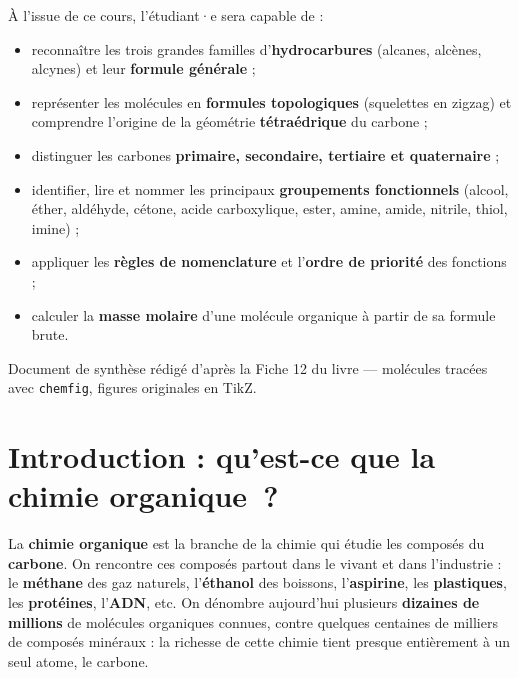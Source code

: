 \documentclass[11pt,a4paper]{article}
\begin{document}
\vspace{0.2cm}

\begin{tcolorbox}[boxbase,colback=primary!5,colframe=primary,width=15cm,
    title={\textsc{Objectifs pédagogiques de la fiche}}]
À l'issue de ce cours, l'étudiant·e sera capable de :
\begin{itemize}[leftmargin=1.6em,topsep=2pt,itemsep=1pt]
  \item reconnaître les trois grandes familles d'\textbf{hydrocarbures} (alcanes, alcènes, alcynes) et leur \textbf{formule générale} ;
  \item représenter les molécules en \textbf{formules topologiques} (squelettes en zigzag) et comprendre l'origine de la géométrie \textbf{tétraédrique} du carbone ;
  \item distinguer les carbones \textbf{primaire, secondaire, tertiaire et quaternaire} ;
  \item identifier, lire et nommer les principaux \textbf{groupements fonctionnels} (alcool, éther, aldéhyde, cétone, acide carboxylique, ester, amine, amide, nitrile, thiol, imine) ;
  \item appliquer les \textbf{règles de nomenclature} et l'\textbf{ordre de priorité} des fonctions ;
  \item calculer la \textbf{masse molaire} d'une molécule organique à partir de sa formule brute.
\end{itemize}
\end{tcolorbox}

\vspace{0.4cm}
{\small\color{black!60} Document de synthèse rédigé d'après la Fiche 12 du livre — molécules tracées avec \texttt{chemfig}, figures originales en TikZ.}
\par
\endgroup

\newpage
\renewcommand{\contentsname}{\textcolor{primarydark}{Table des matières}}
\tableofcontents
\thispagestyle{fancy}
\newpage

\section{Introduction : qu'est-ce que la chimie organique~?}
La \textbf{chimie organique} est la branche de la chimie qui étudie les composés du \textbf{carbone}. On rencontre ces composés partout dans le vivant et dans l'industrie : le \textbf{méthane} des gaz naturels, l'\textbf{éthanol} des boissons, l'\textbf{aspirine}, les \textbf{plastiques}, les \textbf{protéines}, l'\textbf{ADN}, etc. On dénombre aujourd'hui plusieurs \textbf{dizaines de millions} de molécules organiques connues, contre quelques centaines de milliers de composés minéraux : la richesse de cette chimie tient presque entièrement à un seul atome, le carbone.
\end{document}
